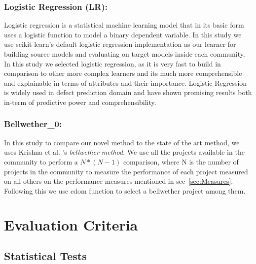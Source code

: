 \documentclass[10pt,journal,compsoc]{IEEEtran}
\begin{document}
\subsubsection{\textbf{Logistic Regression (LR):}}
\label{subsec:LR}

Logistic regression is a statistical machine learning model that in its basic form uses a logistic function to model a binary dependent variable. In this study we use scikit learn's default logistic regression implementation as our learner for building source models and evaluating on target models inside each community. In this study we selected logistic regression, as it is very fast to build in comparison to other more complex learners and its much more comprehensible and explainable in-terms of attributes and their importance. Logistic Regression is widely used in defect prediction domain and have shown promising results both in-term of predictive power and comprehensibility.


\subsubsection{\textbf{Bellwether\_0:}}
\label{Bellwether}

In this study to compare our novel method to the state of the art method, we uses Krishna et al. 's \textit{bellwether method}. We use all the projects available in the community to perform a $N*(N-1)$ comparison, where N is the number of projects in the community to measure the performance of each project measured on all others on the performance measures mentioned in sec~\ref{sec:Measures}. Following this we use cdom function to select a bellwether project among them. 



\section{Evaluation Criteria}
\label{eval}
\subsection{Statistical Tests}
\label{stats}
\end{document}
